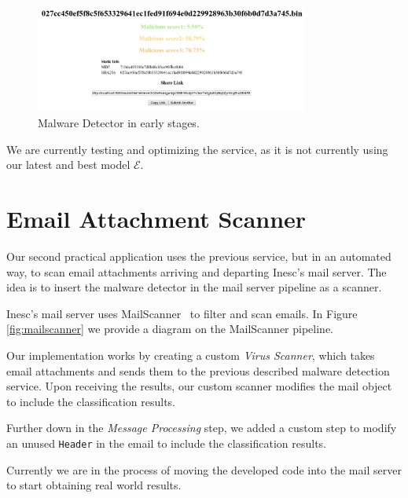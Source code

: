 \begin{figure}[!h]
	\centering
	\includegraphics[width=0.8\textwidth]{Figures/malware_detector.png}
	\caption{Malware Detector in early stages.}
	\label{fig:malware_detetor}
\end{figure}

We are currently testing and optimizing the service, as it is not currently using our latest and best model $\mathcal{E}$.

\section{Email Attachment Scanner}
\label{section:email_scanner}

Our second practical application uses the previous service, but in an automated way, to scan email attachments arriving and departing Inesc's mail server.
The idea is to insert the malware detector in the mail server pipeline as a scanner.

Inesc's mail server uses MailScanner~\cite{tool:mailscanner} to filter and scan emails.
In Figure \ref{fig:mailscanner} we provide a diagram on the MailScanner pipeline.

Our implementation works by creating a custom \textit{Virus Scanner}, which takes email attachments and sends them to the previous described malware detection service.
Upon receiving the results, our custom scanner modifies the mail object to include the classification results.

Further down in the \textit{Message Processing} step, we added a custom step to modify an unused \texttt{Header} in the email to include the classification results.

Currently we are in the process of moving the developed code into the mail server to start obtaining real world results.

